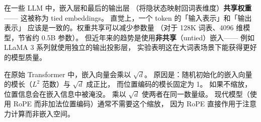 在一些 LLM 中，嵌入层和最后的输出层
（将隐状态映射回词表维度）\textbf{共享权重}——
这被称为 tied embeddings。
直觉上，一个 token 的「输入表示」和「输出表示」
应该是一致的。权重共享可以减少参数量
（对于 128K 词表、4096 维模型，节省约 0.5B 参数）。
但近年来的趋势是使用\textbf{非共享}（untied）嵌入——
例如 LLaMA 3 系列就使用独立的输出投影层，
实验表明这在大词表场景下能获得更好的模型质量。

\begin{whybox}[嵌入层是否需要缩放？]
在原始 Transformer 中，嵌入向量会乘以 $\sqrt{d}$。
原因是：随机初始化的嵌入向量的模长（$L^2$ 范数）与 $\sqrt{d}$ 成正比，
而位置编码的模长固定为 1。
如果不缩放，位置信息会在嵌入信息中被淹没。
乘以 $\sqrt{d}$ 使两者在同一数量级。
现代模型（使用 RoPE 而非加法位置编码）通常不需要这个缩放，
因为 RoPE 直接作用于注意力计算而非嵌入空间。
\end{whybox}


